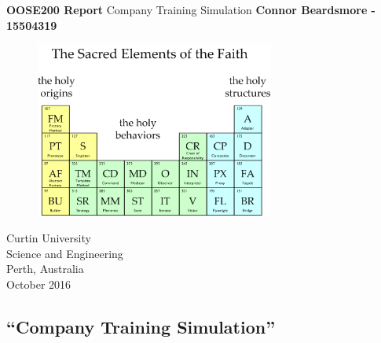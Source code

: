 \documentclass[]{article}
\begin{document}

\begin{titlepage}
	\begin{center}
		\vspace*{1cm}
		\LARGE\textbf{OOSE200 Report}
		\break
		Company Training Simulation
		\vspace{1cm}
		\break
		\Large\textbf{Connor Beardsmore - 15504319} 
		\vspace{2cm}
		\begin{figure}[H]
			\begin{center}
				{ 
					\includegraphics[height=0.4\textheight,width=0.7\textwidth]{placeholder.png}}
			\end{center}
		\end{figure}

		\vspace{4cm}
		\normalsize
		Curtin University \\
		Science and Engineering \\
		Perth, Australia \\
	    October 2016
	    
	\end{center}
\end{titlepage}


\vspace*{-0.8cm}
\begin{center}
	\section*{\textquotedblleft Company Training Simulation\textquotedblright}
\end{center}
\end{document}

